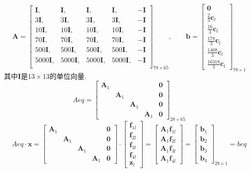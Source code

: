 \documentclass[UTF8]{ctexart}
\begin{document}
\[\bm{A}=\begin{bmatrix}
\bm{I},&\bm{I},&\bm{I},&\bm{I},&-\bm{I}\\
3\bm{I},&3\bm{I},&3\bm{I},&3\bm{I},&-\bm{I}\\
10\bm{I},&10\bm{I},&10\bm{I},&10\bm{I},&-\bm{I}\\
70\bm{I},&70\bm{I},&70\bm{I},&70\bm{I},&-\bm{I}\\
500\bm{I},&500\bm{I},&500\bm{I},&500\bm{I},&-\bm{I}\\
5000\bm{I},&5000\bm{I},&5000\bm{I},&5000\bm{I},&-\bm{I}\\
\end{bmatrix}_{78\times 65},\qquad
\bm{b}=\begin{bmatrix}
\bm{0}\\
\frac{2}{3}\bm{c}_l\\
\frac{16}{3}\bm{c}_l\\
\frac{178}{3}\bm{c}_l\\
\frac{1468}{3}\bm{c}_l\\
\frac{16318}{3}\bm{c}_l
\end{bmatrix}_{78\times 1}
\]
其中$\bm{I}$是$13\times 13$的单位向量.
\[Aeq=\begin{bmatrix}
\bm{A}_1&{}&{}&{}&\bm{0}\\
{}&\bm{A}_1&{}&{}&\bm{0}\\
{}&{}&\bm{A}_1&{}&\bm{0}\\
{}&{}&{}&\bm{A}_1&\bm{0}
\end{bmatrix}_{28\times 65}\]
\[
Aeq\cdot \bm{x}=\begin{bmatrix}
\bm{A}_1&{}&{}&{}&\bm{0}\\
{}&\bm{A}_1&{}&{}&\bm{0}\\
{}&{}&\bm{A}_1&{}&\bm{0}\\
{}&{}&{}&\bm{A}_1&\bm{0}
\end{bmatrix}\cdot
\begin{bmatrix}
\bm{f}_{1l}\\\bm{f}_{2l}\\\bm{f}_{3l}\\\bm{f}_{4l}\\\bm{z}_{l}
\end{bmatrix}=
\begin{bmatrix}
\bm{A}_1\bm{f}_{1l}\\
\bm{A}_1\bm{f}_{2l}\\
\bm{A}_1\bm{f}_{3l}\\
\bm{A}_1\bm{f}_{4l}
\end{bmatrix}=
\begin{bmatrix}
\bm{b}_1\\\bm{b}_2\\\bm{b}_3\\\bm{b}_4
\end{bmatrix}_{28\times 1}=beq\]
\end{document}
